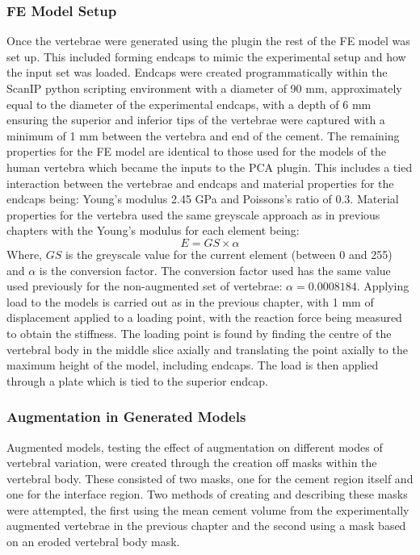 \subsubsection{FE Model Setup}

Once the vertebrae were generated using the plugin the rest of the FE model was
set up.  This included forming endcaps to mimic the experimental setup and how
the input set was loaded.  Endcaps were created programmatically within the
ScanIP python scripting environment with a diameter of 90 mm, approximately
equal to the diameter of the experimental endcaps, with a depth of 6 mm
ensuring the superior and inferior tips of the vertebrae were captured with a
minimum of 1 mm between the vertebra and end of the cement.  The remaining
properties for the FE model are identical to those used for the models of the
human vertebra which became the inputs to the PCA plugin.  This includes a tied
interaction between the vertebrae and endcaps and material properties for the
endcaps being: Young's modulus 2.45 GPa and Poissons's ratio of 0.3.  Material
properties for the vertebra used the same greyscale approach as in previous
chapters with the Young's modulus for each element being: \[ E = GS \times
\alpha \] Where, $GS$ is the greyscale value for the current element (between 0
and 255) and $\alpha$ is the conversion factor.  The conversion factor used has
the same value used previously for the non-augmented set of vertebrae: $\alpha
= 0.0008184$.  Applying load to the models is carried out as in the previous
chapter, with 1 mm of displacement applied to a loading point, with the
reaction force being measured to obtain the stiffness.  The loading point is
found by finding the centre of the vertebral body in the middle slice axially
and translating the point axially to the maximum height of the model, including
endcaps.  The load is then applied through a plate which is tied to the
superior endcap.

\subsubsection{Augmentation in Generated Models}

Augmented models, testing the effect of augmentation on different modes of
vertebral variation, were created through the creation off masks within the
vertebral body. These consisted of two masks, one for the cement region itself
and one for the interface region.  Two methods of creating and describing these
masks were attempted, the first using the mean cement volume from the
experimentally augmented vertebrae in the previous chapter and the second using
a mask based on an eroded vertebral body mask.

